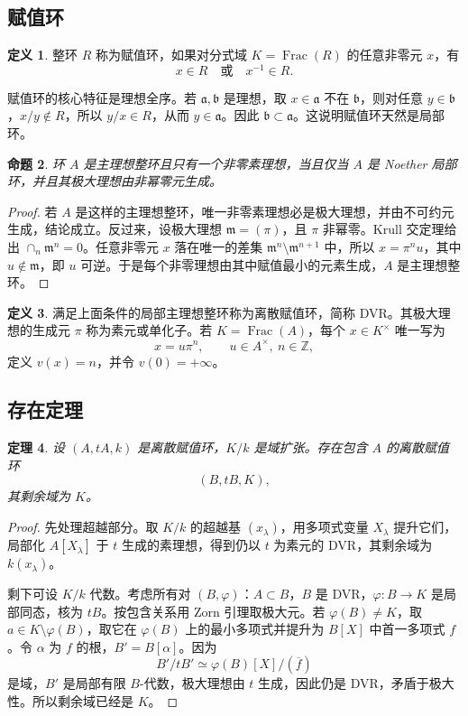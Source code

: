 \documentclass[11pt,a4paper,openany]{ctexbook}
\numberwithin{equation}{chapter}
\newcommand{\Z}{\mathbb{Z}}
\theoremstyle{plain}
\newtheorem{theorem}{定理}[chapter]
\newtheorem{proposition}[theorem]{命题}
\theoremstyle{definition}
\newtheorem{definition}[theorem]{定义}
\theoremstyle{remark}
\begin{document}
\subsection{赋值环}

\begin{definition}
整环 $R$ 称为赋值环，如果对分式域 $K=\operatorname{Frac}(R)$ 的任意非零元 $x$，有
\[
  x\in R\quad\text{或}\quad x^{-1}\in R.
\]
\end{definition}

赋值环的核心特征是理想全序。若 $\mathfrak a,\mathfrak b$ 是理想，取 $x\in\mathfrak a$ 不在 $\mathfrak b$，则对任意 $y\in\mathfrak b$，$x/y\notin R$，所以 $y/x\in R$，从而 $y\in\mathfrak a$。因此 $\mathfrak b\subset\mathfrak a$。这说明赋值环天然是局部环。

\begin{proposition}
环 $A$ 是主理想整环且只有一个非零素理想，当且仅当 $A$ 是 Noether 局部环，并且其极大理想由非幂零元生成。
\end{proposition}

\begin{proof}
若 $A$ 是这样的主理想整环，唯一非零素理想必是极大理想，并由不可约元生成，结论成立。反过来，设极大理想 $\mathfrak m=(\pi)$，且 $\pi$ 非幂零。Krull 交定理给出 $\cap_n\mathfrak m^n=0$。任意非零元 $x$ 落在唯一的差集 $\mathfrak m^n\setminus\mathfrak m^{n+1}$ 中，所以 $x=\pi^nu$，其中 $u\notin\mathfrak m$，即 $u$ 可逆。于是每个非零理想由其中赋值最小的元素生成，$A$ 是主理想整环。
\end{proof}

\begin{definition}
满足上面条件的局部主理想整环称为离散赋值环，简称 DVR。其极大理想的生成元 $\pi$ 称为素元或单化子。若 $K=\operatorname{Frac}(A)$，每个 $x\in K^\times$ 唯一写为
\[
  x=u\pi^n,\qquad u\in A^\times,\ n\in\Z,
\]
定义 $v(x)=n$，并令 $v(0)=+\infty$。
\end{definition}

\subsection{存在定理}

\begin{theorem}
设 $(A,tA,k)$ 是离散赋值环，$K/k$ 是域扩张。存在包含 $A$ 的离散赋值环
\[
  (B,tB,K),
\]
其剩余域为 $K$。
\end{theorem}

\begin{proof}
先处理超越部分。取 $K/k$ 的超越基 $(x_\lambda)$，用多项式变量 $X_\lambda$ 提升它们，局部化 $A[X_\lambda]$ 于 $t$ 生成的素理想，得到仍以 $t$ 为素元的 DVR，其剩余域为 $k(x_\lambda)$。

剩下可设 $K/k$ 代数。考虑所有对 $(B,\varphi)$：$A\subset B$，$B$ 是 DVR，$\varphi:B\to K$ 是局部同态，核为 $tB$。按包含关系用 Zorn 引理取极大元。若 $\varphi(B)\ne K$，取 $a\in K\setminus\varphi(B)$，取它在 $\varphi(B)$ 上的最小多项式并提升为 $B[X]$ 中首一多项式 $f$。令 $\alpha$ 为 $f$ 的根，$B'=B[\alpha]$。因为
\[
  B'/tB'\simeq \varphi(B)[X]/(\overline f)
\]
是域，$B'$ 是局部有限 $B$-代数，极大理想由 $t$ 生成，因此仍是 DVR，矛盾于极大性。所以剩余域已经是 $K$。
\end{proof}
\end{document}
